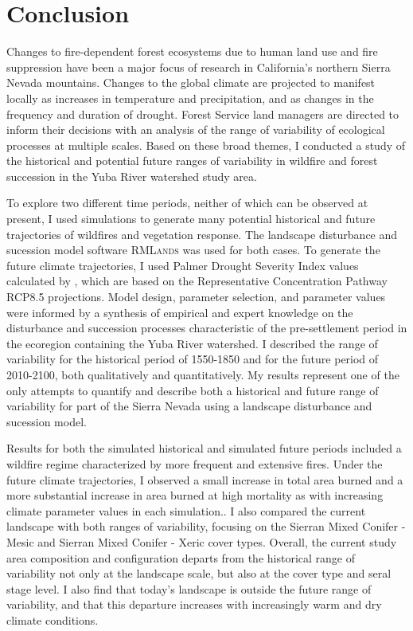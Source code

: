 
\chapter{Conclusion}

Changes to fire-dependent forest ecosystems due to human land use and fire suppression have been a major focus of research in California's northern Sierra Nevada mountains. Changes to the global climate are projected to manifest locally as increases in temperature and precipitation, and as changes in the frequency and duration of drought. Forest Service land managers are directed to inform their decisions with an analysis of the range of variability of ecological processes at multiple scales. Based on these broad themes, I conducted a study of the historical and potential future ranges of variability in wildfire and forest succession in the Yuba River watershed study area.

To explore two different time periods, neither of which can be observed at present, I used simulations to generate many potential historical and future trajectories of wildfires and vegetation response. The landscape disturbance and sucession model software \textsc{RMLands} was used for both cases. To generate the future climate trajectories, I used Palmer Drought Severity Index values calculated by \citet{Cook2014}, which are based on the Representative Concentration Pathway RCP8.5 projections. Model design, parameter selection, and parameter values were informed by a synthesis of empirical and expert knowledge on the disturbance and succession processes characteristic of the pre-settlement period in the ecoregion containing the Yuba River watershed. I described the range of variability for the historical period of 1550-1850 and for the future period of 2010-2100, both qualitatively and quantitatively. My results represent one of the only attempts to quantify and describe both a historical and future range of variability for part of the Sierra Nevada using a landscape disturbance and sucession model.

Results for both the simulated historical and simulated future periods included a wildfire regime characterized by more frequent and extensive fires. Under the future climate trajectories, I observed a small increase in total area burned and a more substantial increase in area burned at high mortality as with increasing climate parameter values in each simulation.. I also compared the current landscape with both ranges of variability, focusing on the Sierran Mixed Conifer - Mesic and Sierran Mixed Conifer - Xeric cover types. Overall, the current study area composition and configuration departs from the historical range of variability not only at the landscape scale, but also at the cover type and seral stage level. I also find that today's landscape is outside the future range of variability, and that this departure increases with increasingly warm and dry climate conditions.

